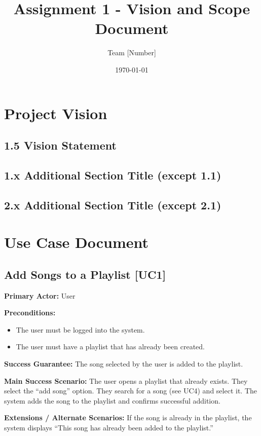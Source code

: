 \documentclass{article}
\title{Assignment 1 - Vision and Scope Document}
\author{Team [Number]}
\date{\today}
\begin{document}
\maketitle

\section{Project Vision}


\subsection{1.5 Vision Statement} 

\subsection{1.x Additional Section Title (except 1.1)} 

\subsection{2.x Additional Section Title (except 2.1)}

\section{Use Case Document}

\subsection{Add Songs to a Playlist [UC1]}
\textbf{Primary Actor:} User

\textbf{Preconditions:} 
\begin{itemize}
  \item The user must be logged into the system.
  \item The user must have a playlist that has already been created.
\end{itemize}

\textbf{Success Guarantee:}  
The song selected by the user is added to the playlist.

\textbf{Main Success Scenario:}  
The user opens a playlist that already exists. They select the ``add song'' option. They search for a song (see UC4) and select it. The system adds the song to the playlist and confirms successful addition.

\textbf{Extensions / Alternate Scenarios:}  
If the song is already in the playlist, the system displays ``This song has already been added to the playlist.''
\end{document}
